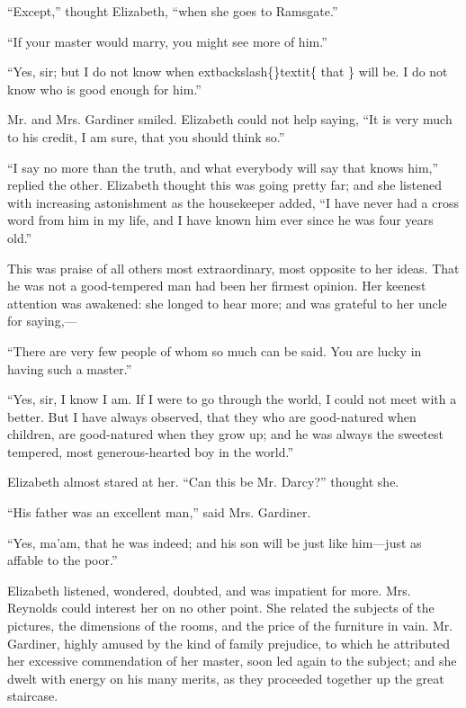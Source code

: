 \documentclass[10pt]{book}
\begin{document}
   “Except,” thought Elizabeth, “when she goes to Ramsgate.”
  

   “If your master would marry, you might see more of him.”
  

   “Yes, sir; but I do not know when
   	extbackslash\{\}textit\{
    that
   \}
   will be. I do not know who is
good enough for him.”
  

   Mr. and Mrs. Gardiner smiled. Elizabeth could not help saying, “It is
very much to his credit, I am sure, that you should think so.”
  

   “I say no more than the truth, and what everybody will say that knows
him,” replied the other. Elizabeth thought this was going pretty far;
and she listened with increasing astonishment as the housekeeper added,
“I have never had a cross word from him in my life, and I have known him
ever since he was four years old.”
  

   This was praise of all others most extraordinary, most opposite to her
ideas. That he was not a good-tempered man had been her firmest opinion.
Her keenest attention was awakened: she longed to hear more; and was
grateful to her uncle for saying,—
  

   “There are very few people of whom so much can be said. You are lucky in
having such a master.”
  

   “Yes, sir, I know I am. If I were to go through the world, I could not
meet with a better. But I have always
   observed, that they who are
good-natured when children, are good-natured when they grow up; and he
was always the sweetest tempered, most generous-hearted boy in the
world.”
  

   Elizabeth almost stared at her. “Can this be Mr. Darcy?” thought she.
  

   “His father was an excellent man,” said Mrs. Gardiner.
  

   “Yes, ma’am, that he was indeed; and his son will be just like him—just
as affable to the poor.”
  

   Elizabeth listened, wondered, doubted, and was impatient for more. Mrs.
Reynolds could interest her on no other point. She related the subjects
of the pictures, the dimensions of the rooms, and the price of the
furniture in vain. Mr. Gardiner, highly amused by the kind of family
prejudice, to which he attributed her excessive commendation of her
master, soon led again to the subject; and she dwelt with energy on his
many merits, as they proceeded together up the great staircase.
  
\end{document}
